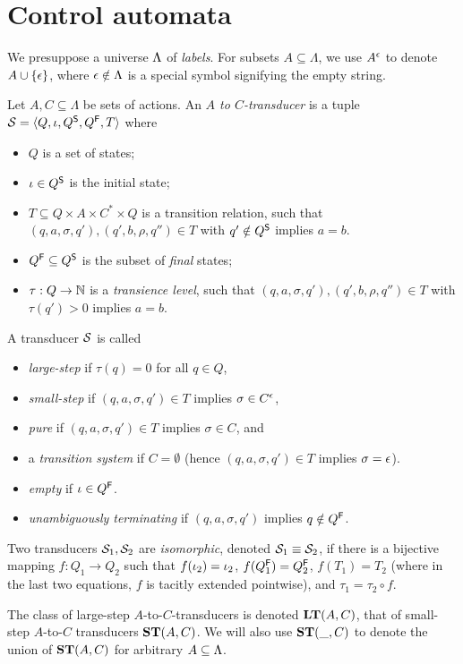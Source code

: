 \section{Control automata}
\label{sec:automata}

We presuppose a universe $\Lambda$ of \emph{labels}. For subsets $A\subseteq \Lambda$, we use $A^\epsilon$ to denote $A\cup\{{\epsilon}\}$, where $\epsilon\notin\Lambda$ is a special symbol signifying the empty string.

\begin{definition}[transducer]
Let $A,C\subseteq \Lambda$ be sets of actions. An \emph{$A$ to $C$-transducer} is a tuple $\mathcal{S}=\langle{Q,\iota,Q^{\mathsf{S}},Q^{\mathsf{F}},T}\rangle$ where
\begin{itemize}[topsep=\itemsep]
\item $Q$ is a set of states;
\item $\iota\in Q^{\mathsf{S}}$ is the initial state;
\item $T\subseteq Q\times A\times C^*\times Q$ is a transition relation, such that $(q,a,\sigma,q'),(q',b,\rho,q'')\in T$ with $q'\notin Q^{\mathsf{S}}$ implies $a=b$.
\item $Q^{\mathsf{F}}\subseteq Q^{\mathsf{S}}$ is the subset of \emph{final} states;
\item $\tau:Q\to \mathbb{N}$ is a \emph{transience level}, such that $(q,a,\sigma,q'),(q',b,\rho,q'')\in T$ with $\tau(q')>0$ implies $a=b$.
\end{itemize}
A transducer $\mathcal{S}$ is called
\begin{itemize}
\item \emph{large-step} if $\tau(q)=0$ for all $q\in Q$,
\item \emph{small-step} if $(q,a,\sigma,q')\in T$ implies $\sigma\in C^\epsilon$,
\item \emph{pure} if $(q,a,\sigma,q')\in T$ implies $\sigma\in C$, and 
\item a \emph{transition system} if $C=\emptyset$ (hence $(q,a,\sigma,q')\in T$ implies $\sigma=\epsilon$).
\item \emph{empty} if $\iota \in Q^{\mathsf{F}}$.
\item \emph{unambiguously terminating} if $(q,a,\sigma,q')$ implies $q\notin Q^{\mathsf{F}}$.
\end{itemize}
Two transducers $\mathcal{S}_1,\mathcal{S}_2$ are \emph{isomorphic}, denoted $\mathcal{S}_1\equiv \mathcal{S}_2$, if there is a bijective mapping $f:Q_1\to Q_2$ such that $f(\iota_2)=\iota_2$, $f(Q^{\mathsf{F}}_1)=Q^{\mathsf{F}}_2$, $f(T_1)=T_2$ (where in the last two equations, $f$ is tacitly extended pointwise), and $\tau_1=\tau_2\circ f$.
\end{definition}
%
The class of large-step $A$-to-$C$-transducers is denoted $\mathbf{LT}(A,C)$, that of small-step $A$-to-$C$ transducers $\mathbf{ST}(A,C)$. We will also use $\mathbf{ST}(\_,C)$ to denote the union of $\mathbf{ST}(A,C)$ for arbitrary $A\subseteq\Lambda$.

